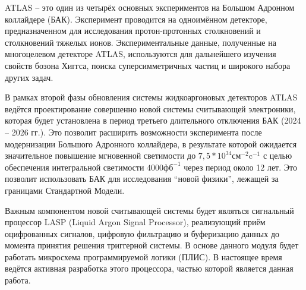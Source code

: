 ATLAS -- это один из четырёх основных экспериментов на Большом Адронном коллайдере (БАК). Эксперимент проводится на одноимённом детекторе, предназначенном для исследования протон-протонных столкновений и столкновений тяжелых ионов. Экспериментальные данные, полученные на многоцелевом детекторе ATLAS, используются для дальнейшего изучения свойств бозона Хиггса, поиска суперсимметричных частиц и широкого набора других задач.\par

В рамках второй фазы обновления системы жидкоаргоновых детекторов ATLAS ведётся проектирование совершенно новой системы считывающей электроники, которая будет установлена в период третьего длительного отключения БАК (2024 -- 2026 гг.). Это позволит расширить возможности эксперимента после модернизации Большого Адронного коллайдера, в результате которой ожидается значительное повышение мгновенной светимости до $7,5*10^{34} \text{см}^{-2}\text{c}^{-1}$ с целью обеспечения интегральной светимости $4000 \text{фб}^{-1}$ через период около 12 лет. Это позволит использовать БАК для исследования ``новой физики'', лежащей за границами Стандартной Модели.\par

Важным компонентом новой считывающей системы будет являться сигнальный процессор LASP (Liquid Argon Signal Processor), реализующий приём оцифрованных сигналов, цифровую фильтрацию и буферизацию данных до момента принятия решения триггерной системы. В основе данного модуля будет работать микросхема программируемой логики (ПЛИС). В настоящее время ведётся активная разработка этого процессора, частью которой является данная работа.\par

